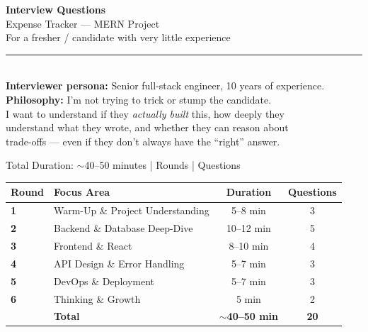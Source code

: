 \documentclass[12pt, a4paper]{article}
\begin{document}
\begin{titlepage}
  \centering
  \vspace*{4cm}

  {\Huge\bfseries\textcolor{emeralddark}{Interview Questions}}\\[0.6cm]
  {\LARGE\textcolor{slate}{Expense Tracker — MERN Project}}\\[1.8cm]

  {\large\textcolor{slatelight}{For a fresher / candidate with very little experience}}\\[3cm]

  \textcolor{emerald}{\rule{8cm}{1.5pt}}\\[1.2cm]

  {\normalsize\textcolor{slatelight}{%
    \textbf{Interviewer persona:} Senior full-stack engineer, 10 years of experience.\\[0.4cm]
    \textbf{Philosophy:} I'm not trying to trick or stump the candidate.\\
    I want to understand if they \emph{actually built} this, how deeply they\\
    understand what they wrote, and whether they can reason about\\
    trade-offs — even if they don't always have the ``right'' answer.%
  }}

  \vfill
  {\small\textcolor{slatelight}{Total Duration: $\sim$40--50 minutes \quad| Rounds \quad| Questions}}
\end{titlepage}

\tableofcontents
\newpage

\begin{center}
\renewcommand{\arraystretch}{1.4}
\begin{tabularx}{\textwidth}{>{\bfseries}l X c c}
  \toprule
  \textbf{Round} & \textbf{Focus Area} & \textbf{Duration} & \textbf{Questions} \\
  \midrule
  1 & Warm-Up \& Project Understanding   & 5--8 min   & 3 \\
  2 & Backend \& Database Deep-Dive       & 10--12 min & 5 \\
  3 & Frontend \& React                   & 8--10 min  & 4 \\
  4 & API Design \& Error Handling        & 5--7 min   & 3 \\
  5 & DevOps \& Deployment                & 5--7 min   & 3 \\
  6 & Thinking \& Growth                  & 5 min      & 2 \\
  \midrule
  & \textbf{Total} & \textbf{$\sim$40--50 min} & \textbf{20} \\
  \bottomrule
\end{tabularx}
\end{center}
\end{document}
